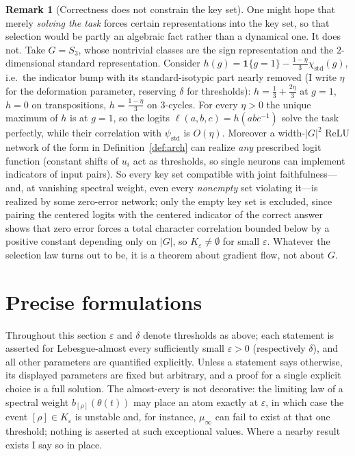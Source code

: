 \documentclass[11pt]{amsart}
\theoremstyle{plain}
\theoremstyle{definition}
\newtheorem{remark}[theorem]{Remark}
\begin{document}
\begin{remark}[Correctness does not constrain the key set]\label{rem:correctness}
One might hope that merely \emph{solving the task} forces certain representations into the key set, so that selection would be partly an algebraic fact rather than a dynamical one. It does not. Take $G = S_3$, whose nontrivial classes are the sign representation and the $2$-dimensional standard representation. Consider $h(g) = \mathbf{1}\{g = 1\} - \frac{1-\eta}{3} \chi_{\mathrm{std}}(g)$, i.e.\ the indicator bump with its standard-isotypic part nearly removed (I write $\eta$ for the deformation parameter, reserving $\delta$ for thresholds): $h = \frac13 + \frac{2\eta}{3}$ at $g = 1$, $h = 0$ on transpositions, $h = \frac{1-\eta}{3}$ on $3$-cycles. For every $\eta > 0$ the unique maximum of $h$ is at $g = 1$, so the logits $\ell(a,b,c) = h(abc^{-1})$ solve the task perfectly, while their correlation with $\psi_{\mathrm{std}}$ is $O(\eta)$. Moreover a width-$|G|^2$ ReLU network of the form in Definition~\ref{def:arch} can realize \emph{any} prescribed logit function (constant shifts of $u_i$ act as thresholds, so single neurons can implement indicators of input pairs). So every key set compatible with joint faithfulness---and, at vanishing spectral weight, even every \emph{nonempty} set violating it---is realized by some zero-error network; only the empty key set is excluded, since pairing the centered logits with the centered indicator of the correct answer shows that zero error forces a total character correlation bounded below by a positive constant depending only on $|G|$, so $K_\varepsilon \neq \emptyset$ for small $\varepsilon$. Whatever the selection law turns out to be, it is a theorem about gradient flow, not about $G$.
\end{remark}

\section{Precise formulations}\label{sec:problems}

Throughout this section $\varepsilon$ and $\delta$ denote thresholds as above; each statement is asserted for Lebesgue-almost every sufficiently small $\varepsilon > 0$ (respectively $\delta$), and all other parameters are quantified explicitly. Unless a statement says otherwise, its displayed parameters are fixed but arbitrary, and a proof for a single explicit choice is a full solution. The almost-every is not decorative: the limiting law of a spectral weight $b_{[\rho]}(\theta(t))$ may place an atom exactly at $\varepsilon$, in which case the event $[\rho] \in K_\varepsilon$ is unstable and, for instance, $\mu_\infty$ can fail to exist at that one threshold; nothing is asserted at such exceptional values. Where a nearby result exists I say so in place.
\end{document}
